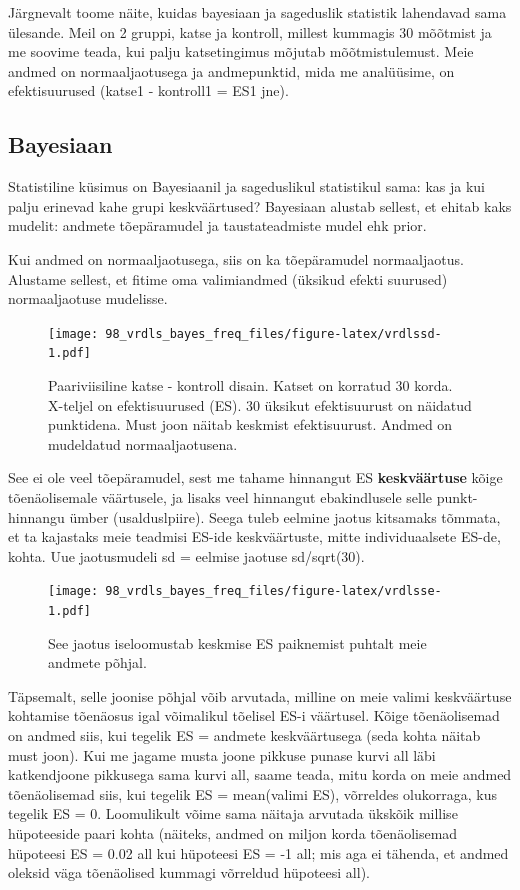 \documentclass[]{book}
\begin{document}
Järgnevalt toome näite, kuidas bayesiaan ja sageduslik statistik
lahendavad sama ülesande. Meil on 2 gruppi, katse ja kontroll, millest
kummagis 30 mõõtmist ja me soovime teada, kui palju katsetingimus
mõjutab mõõtmistulemust. Meie andmed on normaaljaotusega ja
andmepunktid, mida me analüüsime, on efektisuurused (katse1 - kontroll1
= ES1 jne).

\subsection*{Bayesiaan}\label{bayesiaan}

Statistiline küsimus on Bayesiaanil ja sageduslikul statistikul sama:
kas ja kui palju erinevad kahe grupi keskväärtused? Bayesiaan alustab
sellest, et ehitab kaks mudelit: andmete tõepäramudel ja taustateadmiste
mudel ehk prior.

Kui andmed on normaaljaotusega, siis on ka tõepäramudel normaaljaotus.
Alustame sellest, et fitime oma valimiandmed (üksikud efekti suurused)
normaaljaotuse mudelisse.

\begin{figure}
\centering
\texttt{[image: 98\_vrdls\_bayes\_freq\_files/figure-latex/vrdlssd-1.pdf]}
\caption{\label{fig:vrdlssd}Paariviisiline katse - kontroll disain. Katset
on korratud 30 korda. X-teljel on efektisuurused (ES). 30 üksikut
efektisuurust on näidatud punktidena. Must joon näitab keskmist
efektisuurust. Andmed on mudeldatud normaaljaotusena.}
\end{figure}

See ei ole veel tõepäramudel, sest me tahame hinnangut ES
\textbf{keskväärtuse} kõige tõenäolisemale väärtusele, ja lisaks veel
hinnangut ebakindlusele selle punkt-hinnangu ümber (usalduslpiire).
Seega tuleb eelmine jaotus kitsamaks tõmmata, et ta kajastaks meie
teadmisi ES-ide keskväärtuste, mitte individuaalsete ES-de, kohta. Uue
jaotusmudeli sd = eelmise jaotuse sd/sqrt(30).

\begin{figure}
\centering
\texttt{[image: 98\_vrdls\_bayes\_freq\_files/figure-latex/vrdlsse-1.pdf]}
\caption{\label{fig:vrdlsse}See jaotus iseloomustab keskmise ES paiknemist
puhtalt meie andmete põhjal.}
\end{figure}

Täpsemalt, selle joonise põhjal võib arvutada, milline on meie valimi
keskväärtuse kohtamise tõenäosus igal võimalikul tõelisel ES-i
väärtusel. Kõige tõenäolisemad on andmed siis, kui tegelik ES = andmete
keskväärtusega (seda kohta näitab must joon). Kui me jagame musta joone
pikkuse punase kurvi all läbi katkendjoone pikkusega sama kurvi all,
saame teada, mitu korda on meie andmed tõenäolisemad siis, kui tegelik
ES = mean(valimi ES), võrreldes olukorraga, kus tegelik ES = 0.
Loomulikult võime sama näitaja arvutada ükskõik millise hüpoteeside
paari kohta (näiteks, andmed on miljon korda tõenäolisemad hüpoteesi ES
= 0.02 all kui hüpoteesi ES = -1 all; mis aga ei tähenda, et andmed
oleksid väga tõenäolised kummagi võrreldud hüpoteesi all).
\end{document}

